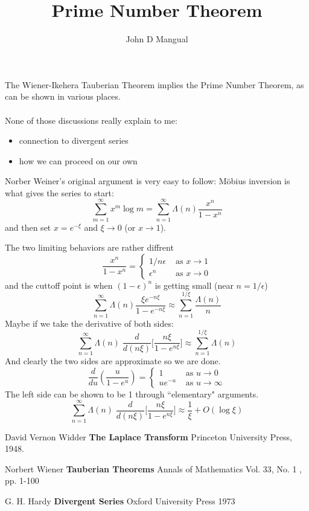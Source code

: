 \documentclass[12pt]{article}
\title{\textbf{Prime Number Theorem}}
\author{John D Mangual}
\date{}
\begin{document}
\selectfont \fontsize{25}{30}\selectfont

\maketitle

\noindent The Wiener-Ikehera Tauberian Theorem implies the Prime Number Theorem, as can be shown in various places. \\ \\ None of those discussions really explain to me:
\begin{itemize}
\item connection to divergent series
\item how we can proceed on our own
\end{itemize}
Norber Weiner's original argument is very easy to follow:
M\"{o}bius inversion is what gives the series to start:
$$ \sum_{m=1}^\infty x^m \log m = \sum_{n=1}^\infty \Lambda(n) \frac{x^n}{1-x^n} $$
and then set $x = e^{-\xi}$ and $\xi \to 0$ (or $x \to 1$). \newpage

\noindent
The two limiting behaviors are rather diffrent
$$  \frac{x^n}{1 - x^n}  = \left\{  \begin{array}{rl}
1/n\epsilon & \text{ as }x \to 1 \\
\epsilon^n & \text{ as } x \to 0 \end{array}\right. $$
and the cuttoff point is when $(1 - \epsilon)^n$ is getting small (near $n = 1/\epsilon$)
$$ \sum_{n=1}^\infty \Lambda(n) \frac{\xi e^{-n\xi}}{1-e^{-n\xi}} \approx \sum_{n=1}^{1/\xi} \frac{\Lambda(n)}{n} $$
Maybe if we take the derivative of both sides:
$$  \sum_{n=1}^\infty \Lambda(n) \; \frac{d}{d(n\xi)}\bigg[ \frac{n\xi }{1-e^{n\xi}} \bigg]  \approx \sum_{n=1}^{1/\xi} \Lambda(n) $$
 And clearly the two sides are approximate so we are done.
$$ \frac{d}{du} \left( \frac{u}{1 - e^u} \right) = \left\{  \begin{array}{cl}
1 & \text{ as }u \to 0 \\
ue^{-u} & \text{ as } u \to \infty \end{array}\right. $$
The left side can be shown to be 1 through ``elementary" arguments. 
$$  \sum_{n=1}^\infty \Lambda(n) \; \frac{d}{d(n\xi)}\bigg[ \frac{n\xi }{1-e^{n\xi}} \bigg] \approx \frac{1}{\xi} + O(\log \xi)$$

\newpage

\selectfont \fontsize{12}{10}\selectfont


\begin{thebibliography}{}

\item David Vernon Widder \textbf{The Laplace Transform} Princeton University Press, 1948.

\item Norbert Wiener \textbf{Tauberian Theorems} Annals of Mathematics Vol. 33, No. 1 , pp. 1-100

\item G. H. Hardy \textbf{Divergent Series} Oxford University Press 1973





\end{thebibliography}
\end{document}
